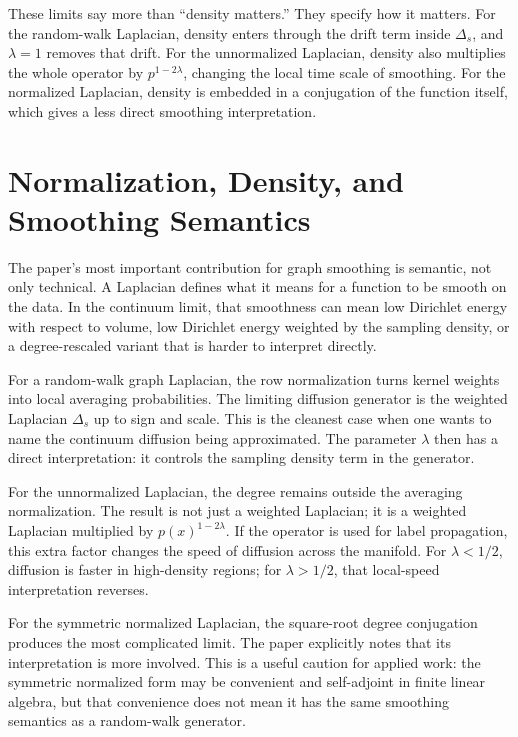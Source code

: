 \documentclass[11pt]{article}
\begin{document}
These limits say more than ``density matters.''  They specify how it matters.
For the random-walk Laplacian, density enters through the drift term inside
$\Delta_s$, and $\lambda=1$ removes that drift.  For the unnormalized
Laplacian, density also multiplies the whole operator by
$p^{1-2\lambda}$, changing the local time scale of smoothing.  For the
normalized Laplacian, density is embedded in a conjugation of the function
itself, which gives a less direct smoothing interpretation.

\section{Normalization, Density, and Smoothing Semantics}

The paper's most important contribution for graph smoothing is semantic, not
only technical.  A Laplacian defines what it means for a function to be smooth
on the data.  In the continuum limit, that smoothness can mean low Dirichlet
energy with respect to volume, low Dirichlet energy weighted by the sampling
density, or a degree-rescaled variant that is harder to interpret directly.

For a random-walk graph Laplacian, the row normalization turns kernel weights
into local averaging probabilities.  The limiting diffusion generator is the
weighted Laplacian $\Delta_s$ up to sign and scale.  This is the cleanest case
when one wants to name the continuum diffusion being approximated.  The
parameter $\lambda$ then has a direct interpretation: it controls the sampling
density term in the generator.

For the unnormalized Laplacian, the degree remains outside the averaging
normalization.  The result is not just a weighted Laplacian; it is a weighted
Laplacian multiplied by $p(x)^{1-2\lambda}$.  If the operator is used for
label propagation, this extra factor changes the speed of diffusion across
the manifold.  For $\lambda<1/2$, diffusion is faster in high-density regions;
for $\lambda>1/2$, that local-speed interpretation reverses.

For the symmetric normalized Laplacian, the square-root degree conjugation
produces the most complicated limit.  The paper explicitly notes that its
interpretation is more involved.  This is a useful caution for applied work:
the symmetric normalized form may be convenient and self-adjoint in finite
linear algebra, but that convenience does not mean it has the same smoothing
semantics as a random-walk generator.
\end{document}
